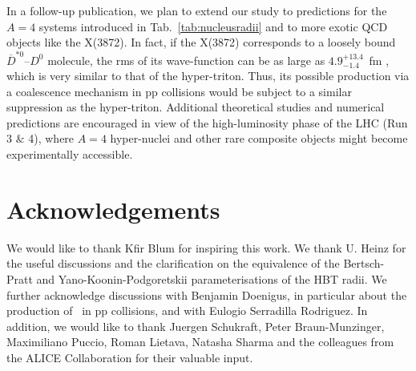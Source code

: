 \documentclass[a4paper,11pt]{scrartcl}
\begin{document}
In a follow-up publication, we plan to extend our study to predictions for the $A=4$ systems introduced in Tab.~\ref{tab:nucleusradii} and to more exotic QCD objects like the X(3872). In fact, if the X(3872) corresponds to a loosely bound $\overline{D}^{*0}$--$D^{0}$ molecule, the rms of its wave-function can be as large as $4.9^{+13.4}_{-1.4}$~fm \cite{Artoisenet:2010uu}, which is very similar to that of the hyper-triton. Thus, its possible production via a coalescence mechanism in pp collisions would be subject to a similar suppression as the hyper-triton. Additional theoretical studies and numerical predictions are encouraged in view of the high-luminosity phase of the LHC (Run 3 $\&$ 4), where $A = 4$ hyper-nuclei and other rare composite objects might become experimentally accessible.



\newenvironment{acknowledgement}{\relax}{\relax}
\begin{acknowledgement}
\section*{Acknowledgements}
We would like to thank Kfir Blum for inspiring this work. We thank U. Heinz for the useful discussions and the clarification on the equivalence of the Bertsch-Pratt and Yano-Koonin-Podgoretskii parameterisations of the HBT radii. We further acknowledge discussions with Benjamin Doenigus, in particular about the production of \hthreelambda\ in pp collisions, and with Eulogio Serradilla Rodriguez. In addition, we would like to thank Juergen Schukraft, Peter Braun-Munzinger, Maximiliano Puccio, Roman Lietava, Natasha Sharma and the colleagues from the ALICE Collaboration for their valuable input. 
\end{acknowledgement}
\end{document}
